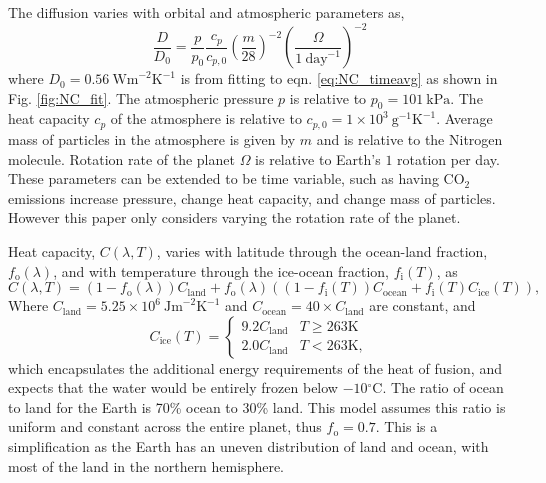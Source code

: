 \documentclass[12pt, onecolumn]{revtex4-2}    %
\newcommand{\heatcap}{\ensuremath{\ \text{Jm}^{-2} \text{K}^{-1}}}
\newcommand{\diffusion}{\ensuremath{\ \text{Wm}^{-2} \text{K}^{-1}}}
\newcommand{\degrees}{\ensuremath{^{\circ}}}
\begin{document}
The diffusion varies with orbital and atmospheric parameters as,
\begin{equation}
  \frac{D}{D_0} = \frac{p}{p_0} \frac{c_p}{c_{p,0}} \left(\frac{m}{28}\right)^{-2} \left(\frac{\Omega}{1\ \text{day}^{-1}}\right)^{-2} \label{eq:diffusion_eqn}
\end{equation}
where $D_0 = 0.56 \diffusion$ is from fitting to eqn. \ref{eq:NC_timeavg} as shown in Fig. \ref{fig:NC_fit}.
The atmospheric pressure $p$ is relative to $p_0 = 101 \ \text{kPa}$.
The heat capacity $c_p$ of the atmosphere is relative to $c_{p,0} = 1\times10^3 \ \text{g}^{-1} \text{K}^{-1}$.
Average mass of particles in the atmosphere is given by $m$ and is relative to the Nitrogen molecule.
Rotation rate of the planet $\Omega$ is relative to Earth's $1$ rotation per day.
These parameters can be extended to be time variable, such as having CO$_2$ emissions increase pressure, change heat capacity, and change mass of particles.
However this paper only considers varying the rotation rate of the planet.

Heat capacity, $C(\lambda, T)$, varies with latitude through the ocean-land fraction, $f_\text{o}(\lambda)$, and with temperature through the ice-ocean fraction, $f_\text{i}(T)$, as
\begin{equation}
  C(\lambda, T) = (1 - f_\text{o}(\lambda)) C_\text{land} + f_\text{o}(\lambda) ((1-f_\text{i}(T)) C_\text{ocean} + f_\text{i}(T) C_\text{ice}(T)),
\end{equation}
Where $C_{\text{land}} = 5.25\times10^6 \heatcap$ and $C_{\text{ocean}} = 40 \times C_{\text{land}}$ are constant, and
\begin{equation}
  C_{\text{ice}}(T) =
  \begin{cases}
    9.2 C_\text{land} & T \ge 263\text{K} \\
    2.0 C_\text{land} & T < 263\text{K},
  \end{cases}
\end{equation}
which encapsulates the additional energy requirements of the heat of fusion, and expects that the water would be entirely frozen below $-10\degrees$C.
The ratio of ocean to land for the Earth is 70\% ocean to 30\% land.
This model assumes this ratio is uniform and constant across the entire planet, thus $f_\text{o} = 0.7$.
This is a simplification as the Earth has an uneven distribution of land and ocean, with most of the land in the northern hemisphere.
\end{document}
